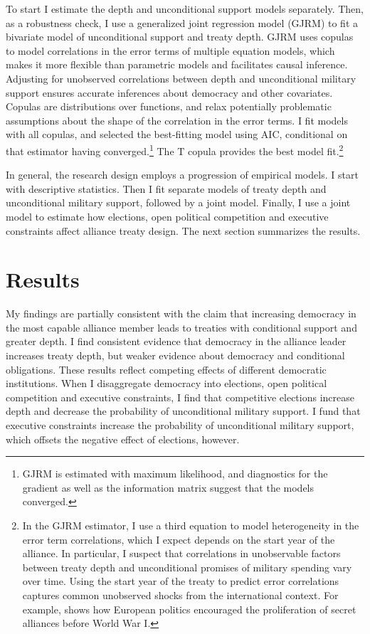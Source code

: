 \documentclass[12pt]{article}
\begin{document}
To start I estimate the depth and unconditional support models separately. 
Then, as a robustness check, I use a generalized joint regression model (GJRM) \citep{Braumoelleretal2018} to fit a bivariate model of unconditional support and treaty depth.
GJRM uses copulas to model correlations in the error terms of multiple equation models, which makes it more flexible than parametric models and facilitates causal inference. 
Adjusting for unobserved correlations between depth and unconditional military support ensures accurate inferences about democracy and other covariates. 
Copulas are distributions over functions, and relax potentially problematic assumptions about the shape of the correlation in the error terms. 
I fit models with all copulas, and selected the best-fitting model using AIC, conditional on that estimator having converged.\footnote{GJRM is estimated with maximum likelihood, and diagnostics for the gradient as well as the information matrix suggest that the models converged.} 
The T copula provides the best model fit.\footnote{In the GJRM estimator, I use a third equation to model heterogeneity in the error term correlations, which I expect depends on the start year of the alliance. 
In particular, I suspect that correlations in unobservable factors between treaty depth and unconditional promises of military spending vary over time. 
Using the start year of the treaty to predict error correlations captures common unobserved shocks from the international context. 
For example, \citet{Kuo2019} shows how European politics encouraged the proliferation of secret alliances before World War I.}


In general, the research design employs a progression of empirical models. 
I start with descriptive statistics. 
Then I fit separate models of treaty depth and unconditional military support, followed by a joint model. 
Finally, I use a joint model to estimate how elections, open political competition and executive constraints affect alliance treaty design. 
The next section summarizes the results. 


\section{Results}


My findings are partially consistent with the claim that increasing democracy in the most capable alliance member leads to treaties with conditional support and greater depth. 
I find consistent evidence that democracy in the alliance leader increases treaty depth, but weaker evidence about democracy and conditional obligations. 
These results reflect competing effects of different democratic institutions. 
When I disaggregate democracy into elections, open political competition and executive constraints, I find that competitive elections increase depth and decrease the probability of unconditional military support.
I fund that executive constraints increase the probability of unconditional military support, which offsets the negative effect of elections, however. 
\end{document}
